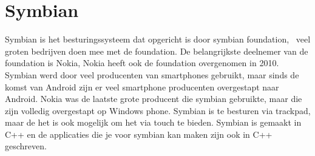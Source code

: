 \section{Symbian}

Symbian is het besturingssysteem dat opgericht is door symbian foundation,  veel groten bedrijven doen mee met de foundation. De belangrijkste deelnemer van de foundation is Nokia, Nokia heeft ook de foundation overgenomen in 2010. Symbian werd door veel producenten van smartphones gebruikt, maar sinds de komst van Android zijn er veel smartphone producenten overgestapt naar Android. Nokia was de laatste grote producent die symbian gebruikte, maar die zijn volledig overgestapt op Windows phone. Symbian is te besturen via trackpad, maar de het is ook mogelijk om het via touch te bieden. Symbian is gemaakt in C++ en de applicaties die je voor symbian kan maken zijn ook in C++ geschreven.
